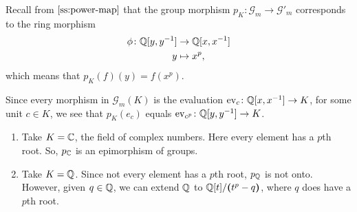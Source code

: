 \begin{solution}
    Recall from $\ref{ss:power-map}$ that the group morphism $p_K\colon\mathcal G_m\to\mathcal G'_m$ corresponds to the ring morphism
    \begin{align*}
        \phi\colon\mathbb{Q}[y,y^{-1}]&\to\mathbb{Q}[x,x^{-1}]\\
        y&\mapsto x^p,
    \end{align*}
    which means that $p_K(f)(y)=f(x^p)$.
    
    Since every morphism in $\mathcal G_m(K)$ is the evaluation $\text{\rm ev}_c\colon\mathbb{Q}[x,x^{-1}]\to K$, for some unit $c\in K$, we see that $p_K(e_c)$ equals $\text{\rm ev}_{c^p}\colon\mathbb{Q}[y,y^{-1}]\to K$.
    \begin{enumerate}[\rm a)]
        \item Take $K=\mathbb{C}$, the field of complex numbers. Here every element has a $p$th root. So, $p_{\mathbb{C}}$ is an epimorphism of groups.

        \item Take $K=\mathbb{Q}$. Since not every element has a $p$th root, $p_{\mathbb{Q}}$ is not onto. However, given $q\in\mathbb{Q}$, we can extend $\mathbb{Q}$ to $\mathbb{Q}[t]/\textrm{\boldmath$($}t^p-q\textrm{\boldmath$)$}$, where $q$ does have a $p$th root. 
    \end{enumerate}
\end{solution}